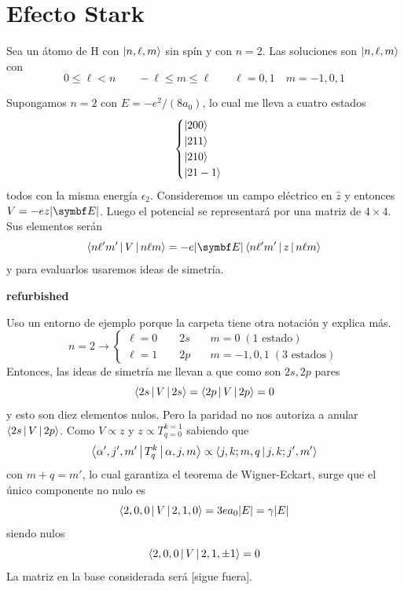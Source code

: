 \documentclass[10pt,oneside]{CBFT_book}
\begin{document}
\section{Efecto Stark}

Sea un átomo de H con $\Ket{n,\ell,m}$ sin spín y con $n=2$. 
Las soluciones son $\Ket{n,\ell,m}$ con
\[
	0 \leq \ell < n \qquad -\ell \leq m\leq \ell \qquad \ell=0,1 \quad m=-1,0,1
\]

Supongamos $n=2$ con $ E = - e^2 /(8a_0) $, lo cual me lleva a cuatro estados 
\[
	\begin{cases}
	 \Ket{200} \\
	 \Ket{211} \\
	 \Ket{210} \\
	 \Ket{21-1} \\
	\end{cases}
\]
todos con la misma energía $\epsilon_2$.
Consideremos un campo eléctrico en $\hat{z}$ y entonces $V=-ez|\vb{E}|$. 
Luego el potencial se representará por una matriz de $4\times 4$. Sus elementos
serán
\[
	\Braket{n\ell'm'|V|n\ell m} = -e|\vb{E}|\Braket{n\ell'm'|z|n\ell m}
\]
y para evaluarlos usaremos ideas de simetría.

\begin{ejemplo}{\bf refurbished}

Uso un entorno de ejemplo porque la carpeta tiene otra notación y explica más.
\[
	n=2 \to \begin{cases}
	 \ell=0 \qquad 2s \quad & m=0 \; ( 1 \text{ estado}) \\
	 \ell=1 \qquad 2p \quad & m=-1,0,1 \; ( 3 \text{ estados}) 
	\end{cases}
\]
Entonces, las ideas de simetría me llevan a que como son $2s, 2p$ pares
\[
	\Braket{2s|V|2s} = \Braket{2p|V|2p} = 0
\]
y esto son diez elementos nulos. Pero la paridad no nos autoriza a anular $\Braket{2s|V|2p}$.
Como $V \propto z$ y $z \propto T_{q=0}^{k=1}$ sabiendo que
\[
	\Braket{\alpha',j',m'|T_{q}^{k}|\alpha, j, m} \propto 
	\Braket{j,k;m,q|j,k;j',m'}
\]
con $m+q=m'$,
lo cual garantiza el teorema de Wigner-Eckart, surge que el único componente no nulo es
\[
	\Braket{2,0,0|V|2,1,0} = 3 e a_0 |E| = \gamma |E|
\]
siendo nulos
\[
	\Braket{2,0,0|V|2,1,\pm 1} = 0
\]
La matriz en la base considerada será [sigue fuera].
 
\end{ejemplo}
\end{document}
